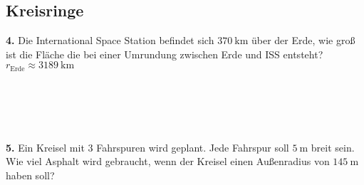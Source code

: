     \newpage
    \subsection*{Kreisringe}
    \textbf{4.}
    Die International Space Station befindet sich $\SI{370}{\kilo\meter}$ über der Erde,
    wie groß ist die Fläche die bei einer Umrundung zwischen Erde und ISS entsteht?
    $r_\text{Erde} \approx \SI{3189}{\kilo\meter}$
    \\~\\~\\~\\~\\~\\
    \textbf{5.}
    Ein Kreisel mit 3 Fahrspuren wird geplant. Jede Fahrspur soll $\SI{5}{\meter}$ breit sein.
    Wie viel Asphalt wird gebraucht, wenn der Kreisel einen Außenradius von $\SI{145}{\meter}$ haben soll?
    \\~\\~\\~\\~\\~\\


